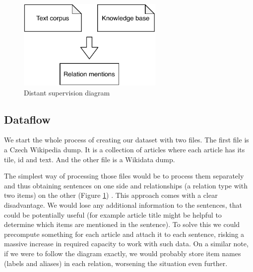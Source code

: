 \begin{figure}[h]\centering
\includegraphics[width=70mm]{./img//Diplomka diagramy-Distant supervision}
\caption{Distant supervision diagram}
\label{obr03:DSD}
\end{figure}

\subsection{Dataflow}

We start the whole process of creating our dataset with two files. The first file is a Czech Wikipedia dump. It is a collection of articles where each article has its tile, id and text. And the other file is a Wikidata dump. 

The simplest way of processing those files would be to process them separately and thus obtaining sentences on one side and relationships (a relation type with two items) on the other (Figure \ref{obr03:DSD}) . This approach comes with a clear disadvantage. We would lose any additional information to the sentences, that could be potentially useful (for example article title might be helpful to determine which items are mentioned in the sentence). To solve this we could precompute something for each article and attach it to each sentence, risking a massive increase in required capacity to work with such data. On a similar note, if we were to follow the diagram exactly, we would probably store item names (labels and aliases) in each relation, worsening the situation even further.

